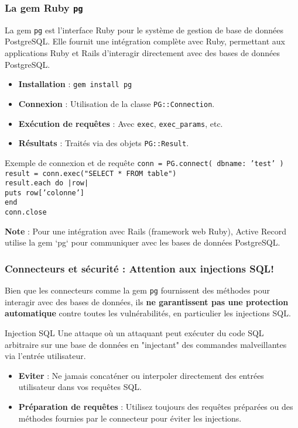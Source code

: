 \begin{frame}
  \frametitle{La gem Ruby \texttt{pg}}

  La gem \texttt{pg} est l'interface Ruby pour le système de gestion de base de données PostgreSQL. Elle fournit une intégration complète avec Ruby, permettant aux applications Ruby et Rails d'interagir directement avec des bases de données PostgreSQL.

  \begin{itemize}
    \small
    \item \textbf{Installation} : \texttt{gem install pg}
    \item \textbf{Connexion} : Utilisation de la classe \texttt{PG::Connection}.
    \item \textbf{Exécution de requêtes} : Avec \texttt{exec}, \texttt{exec\_params}, etc.
    \item \textbf{Résultats} : Traités via des objets \texttt{PG::Result}.
  \end{itemize}

  \begin{exampleblock}{Exemple de connexion et de requête}
    \small
    \texttt{conn = PG.connect( dbname: 'test' ) \\
    result = conn.exec("SELECT * FROM table") \\
    result.each do |row| \\
    \quad puts row['colonne'] \\
    end \\
    conn.close}
  \end{exampleblock}

  \small
  \textbf{Note} : Pour une intégration avec Rails (framework web Ruby), Active Record utilise la gem `pg` pour communiquer avec les bases de données PostgreSQL.

\end{frame}

\begin{frame}
  \frametitle{Connecteurs et sécurité : Attention aux injections SQL!}

  Bien que les connecteurs comme la gem \texttt{pg} fournissent des méthodes pour interagir avec des bases de données, ils \textbf{ne garantissent pas une protection automatique} contre toutes les vulnérabilités, en particulier les injections SQL.

  \begin{block}{Injection SQL}
    Une attaque où un attaquant peut exécuter du code SQL arbitraire sur une base de données en "injectant" des commandes malveillantes via l'entrée utilisateur.
  \end{block}

  \begin{itemize}
    \item \textbf{Eviter} : Ne jamais concaténer ou interpoler directement des entrées utilisateur dans vos requêtes SQL.
    \item \textbf{Préparation de requêtes} : Utilisez toujours des requêtes préparées ou des méthodes fournies par le connecteur pour éviter les injections.
  \end{itemize}

\end{frame}

